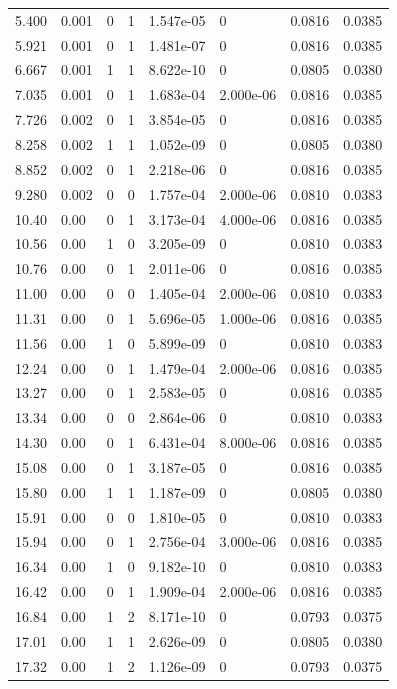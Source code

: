 \documentclass[preview]{standalone}
\begin{document}
{{\begin{tabular}{L{1.2cm}C{1.2cm} C{0.3cm}C{0.5cm} C{1.4cm}C{1.4cm} C{1.4cm}C{1.4cm}}
  5.400  &  0.001  & 0     &  1 &  1.547e-05  & 0  & 0.0816 &  0.0385   \\ 
  5.921  &  0.001  & 0     &  1 &  1.481e-07  & 0  & 0.0816 &  0.0385   \\ 
  6.667  &  0.001  & 1     &  1 &  8.622e-10  & 0  & 0.0805 &  0.0380   \\ 
  7.035  &  0.001  & 0     &  1 &  1.683e-04  & 2.000e-06  & 0.0816 &  0.0385   \\ 
  7.726  &  0.002  & 0     &  1 &  3.854e-05  & 0  & 0.0816 &  0.0385   \\ 
  8.258  &  0.002  & 1     &  1 &  1.052e-09  & 0  & 0.0805 &  0.0380   \\ 
  8.852  &  0.002  & 0     &  1 &  2.218e-06  & 0  & 0.0816 &  0.0385   \\ 
  9.280  &  0.002  & 0     &  0 &  1.757e-04  & 2.000e-06  & 0.0810 &  0.0383   \\ 
  10.40  &  0.00  & 0     &  1 &  3.173e-04  & 4.000e-06  & 0.0816 &  0.0385   \\ 
  10.56  &  0.00  & 1     &  0 &  3.205e-09  & 0  & 0.0810 &  0.0383   \\ 
  10.76  &  0.00  & 0     &  1 &  2.011e-06  & 0  & 0.0816 &  0.0385   \\ 
  11.00  &  0.00  & 0     &  0 &  1.405e-04  & 2.000e-06  & 0.0810 &  0.0383   \\ 
  11.31  &  0.00  & 0     &  1 &  5.696e-05  & 1.000e-06  & 0.0816 &  0.0385   \\ 
  11.56  &  0.00  & 1     &  0 &  5.899e-09  & 0  & 0.0810 &  0.0383   \\ 
  12.24  &  0.00  & 0     &  1 &  1.479e-04  & 2.000e-06  & 0.0816 &  0.0385   \\ 
  13.27  &  0.00  & 0     &  1 &  2.583e-05  & 0  & 0.0816 &  0.0385   \\ 
  13.34  &  0.00  & 0     &  0 &  2.864e-06  & 0  & 0.0810 &  0.0383   \\ 
  14.30  &  0.00  & 0     &  1 &  6.431e-04  & 8.000e-06  & 0.0816 &  0.0385   \\ 
  15.08  &  0.00  & 0     &  1 &  3.187e-05  & 0  & 0.0816 &  0.0385   \\ 
  15.80  &  0.00  & 1     &  1 &  1.187e-09  & 0  & 0.0805 &  0.0380   \\ 
  15.91  &  0.00  & 0     &  0 &  1.810e-05  & 0  & 0.0810 &  0.0383   \\ 
  15.94  &  0.00  & 0     &  1 &  2.756e-04  & 3.000e-06  & 0.0816 &  0.0385   \\ 
  16.34  &  0.00  & 1     &  0 &  9.182e-10  & 0  & 0.0810 &  0.0383   \\ 
  16.42  &  0.00  & 0     &  1 &  1.909e-04  & 2.000e-06  & 0.0816 &  0.0385   \\ 
  16.84  &  0.00  & 1     &  2 &  8.171e-10  & 0  & 0.0793 &  0.0375   \\ 
  17.01  &  0.00  & 1     &  1 &  2.626e-09  & 0  & 0.0805 &  0.0380   \\ 
  17.32  &  0.00  & 1     &  2 &  1.126e-09  & 0  & 0.0793 &  0.0375   \\ 
\hline 
\end{tabular} 

}}
\end{document}
